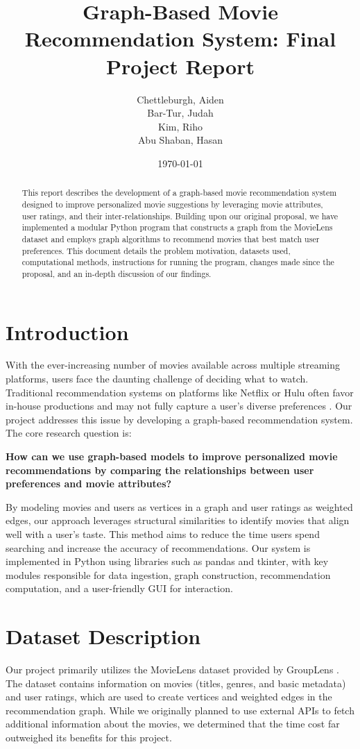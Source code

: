 \documentclass[12pt]{article}
\title{Graph-Based Movie Recommendation System: Final Project Report}
\author{
    Chettleburgh, Aiden \\
    Bar-Tur, Judah \\
    Kim, Riho \\
    Abu Shaban, Hasan
}
\date{\today}
\begin{document}
\maketitle

\begin{abstract}
This report describes the development of a graph-based movie recommendation system designed to improve personalized movie suggestions by leveraging movie attributes, user ratings, and their inter-relationships. Building upon our original proposal, we have implemented a modular Python program that constructs a graph from the MovieLens dataset and employs graph algorithms to recommend movies that best match user preferences. This document details the problem motivation, datasets used, computational methods, instructions for running the program, changes made since the proposal, and an in-depth discussion of our findings.
\end{abstract}

\section{Introduction}
With the ever-increasing number of movies available across multiple streaming platforms, users face the daunting challenge of deciding what to watch. Traditional recommendation systems on platforms like Netflix or Hulu often favor in-house productions and may not fully capture a user’s diverse preferences \cite{Netflix}. Our project addresses this issue by developing a graph-based recommendation system. The core research question is:

\begin{center}
\textbf{How can we use graph-based models to improve personalized movie recommendations by comparing the relationships between user preferences and movie attributes?}
\end{center}

By modeling movies and users as vertices in a graph and user ratings as weighted edges, our approach leverages structural similarities to identify movies that align well with a user’s taste. This method aims to reduce the time users spend searching and increase the accuracy of recommendations. Our system is implemented in Python using libraries such as pandas and tkinter, with key modules responsible for data ingestion, graph construction, recommendation computation, and a user-friendly GUI for interaction.

\section{Dataset Description}
Our project primarily utilizes the MovieLens dataset provided by GroupLens \cite{GroupLens}. The dataset contains information on movies (titles, genres, and basic metadata) and user ratings, which are used to create vertices and weighted edges in the recommendation graph. While we originally planned to use external APIs to fetch additional information about the movies, we determined that the time cost far outweighed its benefits for this project.
\end{document}
